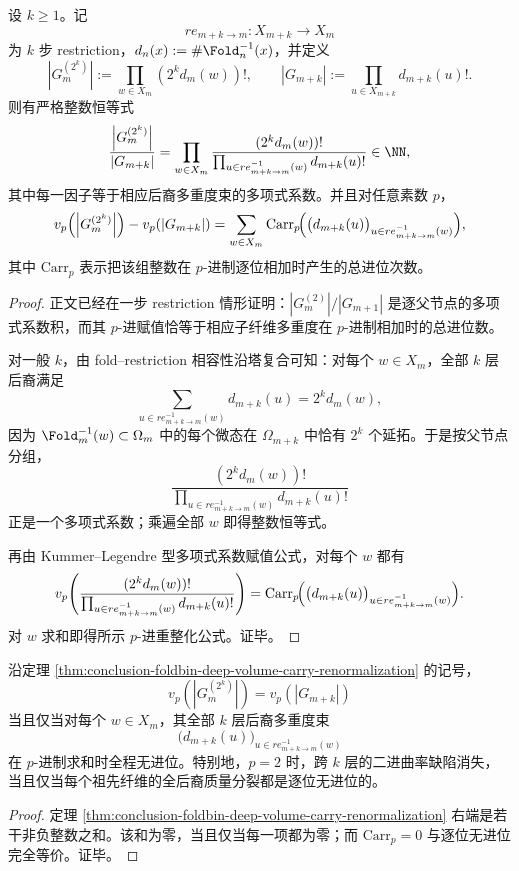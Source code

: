 \begin{theorem}\label{thm:conclusion-foldbin-deep-volume-carry-renormalization}
设 \(k\ge 1\)。记
\[
re_{m+k\to m}:X_{m+k}\to X_m
\]
为 \(k\) 步 restriction，\(d_n(x):=\#\Fold_n^{-1}(x)\)，并定义
\[
\left|G_m^{(2^k)}\right|:=\prod_{w\in X_m}(2^k d_m(w))!,
\qquad
\left|G_{m+k}\right|:=\prod_{u\in X_{m+k}}d_{m+k}(u)!.
\]
则有严格整数恒等式
\[
\frac{\left|G_m^{(2^k)}\right|}{\left|G_{m+k}\right|}
=
\prod_{w\in X_m}
\frac{(2^k d_m(w))!}{\prod_{u\in re_{m+k\to m}^{-1}(w)} d_{m+k}(u)!}
\in \NN,
\]
其中每一因子等于相应后裔多重度束的多项式系数。并且对任意素数 \(p\)，
\[
v_p\!\left(\left|G_m^{(2^k)}\right|\right)-v_p\!\left(\left|G_{m+k}\right|\right)
=
\sum_{w\in X_m}
\mathrm{Carr}_p\!\Bigl(\bigl(d_{m+k}(u)\bigr)_{u\in re_{m+k\to m}^{-1}(w)}\Bigr),
\]
其中 \(\mathrm{Carr}_p\) 表示把该组整数在 \(p\)-进制逐位相加时产生的总进位次数。
\end{theorem}
\begin{proof}
正文已经在一步 restriction 情形证明：\(\left|G_m^{(2)}\right|/\left|G_{m+1}\right|\) 是逐父节点的多项式系数积，而其 \(p\)-进赋值恰等于相应子纤维多重度在 \(p\)-进制相加时的总进位数。

对一般 \(k\)，由 fold--restriction 相容性沿塔复合可知：对每个 \(w\in X_m\)，全部 \(k\) 层后裔满足
\[
\sum_{u\in re_{m+k\to m}^{-1}(w)} d_{m+k}(u)=2^k d_m(w),
\]
因为 \(\Fold_m^{-1}(w)\subset \Omega_m\) 中的每个微态在 \(\Omega_{m+k}\) 中恰有 \(2^k\) 个延拓。于是按父节点分组，
\[
\frac{(2^k d_m(w))!}{\prod_{u\in re_{m+k\to m}^{-1}(w)} d_{m+k}(u)!}
\]
正是一个多项式系数；乘遍全部 \(w\) 即得整数恒等式。

再由 Kummer--Legendre 型多项式系数赋值公式，对每个 \(w\) 都有
\[
v_p\!\left(
\frac{(2^k d_m(w))!}{\prod_{u\in re_{m+k\to m}^{-1}(w)} d_{m+k}(u)!}
\right)
=
\mathrm{Carr}_p\!\Bigl(\bigl(d_{m+k}(u)\bigr)_{u\in re_{m+k\to m}^{-1}(w)}\Bigr).
\]
对 \(w\) 求和即得所示 \(p\)-进重整化公式。证毕。
\end{proof}

\begin{corollary}\label{cor:conclusion-foldbin-deep-padic-flatness-criterion}
沿定理 \ref{thm:conclusion-foldbin-deep-volume-carry-renormalization} 的记号，
\[
v_p\!\left(\left|G_m^{(2^k)}\right|\right)=v_p\!\left(\left|G_{m+k}\right|\right)
\]
当且仅当对每个 \(w\in X_m\)，其全部 \(k\) 层后裔多重度束
\[
\bigl(d_{m+k}(u)\bigr)_{u\in re_{m+k\to m}^{-1}(w)}
\]
在 \(p\)-进制求和时全程无进位。特别地，\(p=2\) 时，跨 \(k\) 层的二进曲率缺陷消失，当且仅当每个祖先纤维的全后裔质量分裂都是逐位无进位的。
\end{corollary}
\begin{proof}
定理 \ref{thm:conclusion-foldbin-deep-volume-carry-renormalization} 右端是若干非负整数之和。该和为零，当且仅当每一项都为零；而 \(\mathrm{Carr}_p=0\) 与逐位无进位完全等价。证毕。
\end{proof}

